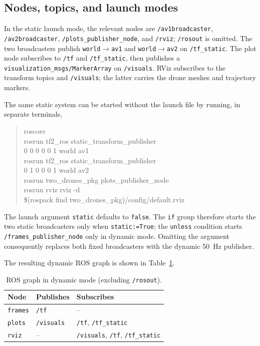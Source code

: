 \documentclass[letterpaper,10pt,conference]{ieeeconf}
\begin{document}
\subsection{Nodes, topics, and launch modes}
In the static launch mode, the relevant nodes are \texttt{/av1broadcaster}, \texttt{/av2broadcaster}, \texttt{/plots\_publisher\_node}, and \texttt{/rviz}; \texttt{/rosout} is omitted. The two broadcasters publish \texttt{world$\rightarrow$av1} and \texttt{world$\rightarrow$av2} on \texttt{/tf\_static}. The plot node subscribes to \texttt{/tf} and \texttt{/tf\_static}, then publishes a \texttt{visualization\_msgs/MarkerArray} on \texttt{/visuals}. RViz subscribes to the transform topics and \texttt{/visuals}; the latter carries the drone meshes and trajectory markers.

The same static system can be started without the launch file by running, in separate terminals,
\begin{quote}\scriptsize\ttfamily
roscore\\
rosrun tf2\_ros static\_transform\_publisher\\
 0 0 0 0 0 1 world av1\\
rosrun tf2\_ros static\_transform\_publisher\\
 0 1 0 0 0 1 world av2\\
rosrun two\_drones\_pkg plots\_publisher\_node\\
rosrun rviz rviz -d\\
\$(rospack find two\_drones\_pkg)/config/\allowbreak default.rviz
\end{quote}

The launch argument \texttt{static} defaults to \texttt{false}. The \texttt{if} group therefore starts the two static broadcasters only when \texttt{static:=True}; the \texttt{unless} condition starts \texttt{/frames\_publisher\_node} only in dynamic mode. Omitting the argument consequently replaces both fixed broadcasters with the dynamic 50~Hz publisher.

The resulting dynamic ROS graph is shown in Table~\ref{tab:runtime_graph}.

\begin{table}[h]
\caption{ROS graph in dynamic mode (excluding \texttt{/rosout}).}
\label{tab:runtime_graph}
\centering
\small
\setlength{\tabcolsep}{3pt}
\begin{tabular}{lll}
\toprule
Node & Publishes & Subscribes \\
\midrule
\texttt{frames} & \texttt{/tf} & -- \\
\texttt{plots} & \texttt{/visuals} & \texttt{/tf}, \texttt{/tf\_static} \\
\texttt{rviz} & -- & \texttt{/visuals}, \texttt{/tf}, \texttt{/tf\_static} \\
\bottomrule
\end{tabular}
\end{table}
\end{document}
